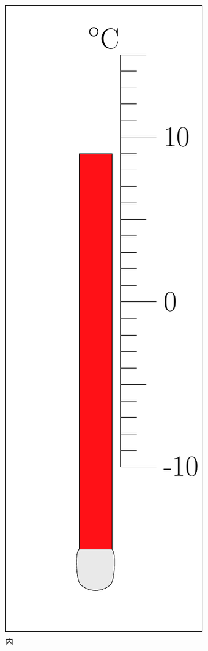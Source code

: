 \documentclass[12pt,twoside]{exam}
\begin{document}
\begin{knowledge}
\begin{minipage}{\textwidth}
\begin{minipage}[c][6cm][c]{0.2\textwidth}
\begin{figure}[H]
\includegraphics[width=0.9\linewidth]{figures/2013湖北黄冈34丙.pdf} 
\caption{丙}
\end{figure}
\end{minipage} 


\end{minipage}
\end{knowledge}
\end{document}
